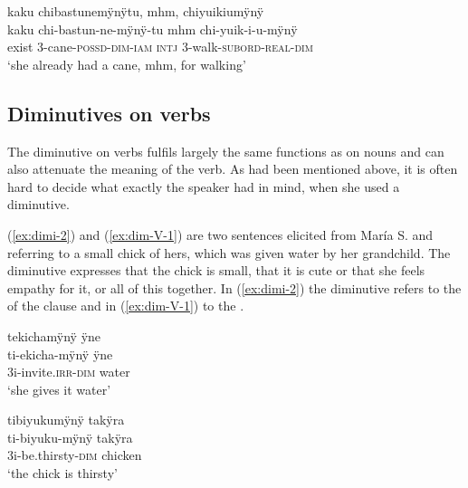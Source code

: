\ea\label{ex:dim-pity-2}
\begingl 
\glpreamble kaku chibastunemÿnÿtu, mhm, chiyuikiumÿnÿ\\
\gla kaku chi-bastun-ne-mÿnÿ-tu mhm chi-yuik-i-u-mÿnÿ\\ 
\glb exist 3-cane-\textsc{possd}-\textsc{dim}-\textsc{iam} \textsc{intj} 3-walk-\textsc{subord}-\textsc{real}-\textsc{dim}\\ 
\glft ‘she already had a cane, mhm, for walking’
\trailingcitation{[jxx-p120515l-1.220-221]}
\xe




\subsection{Diminutives on verbs}\label{sec:Diminuitves_Verbs}

The diminutive on verbs fulfils largely the same functions as on nouns and can also attenuate the meaning of the verb. As had been mentioned above, it is often hard to decide what exactly the speaker had in mind, when she used a diminutive.

(\ref{ex:dimi-2}) and (\ref{ex:dim-V-1}) are two sentences elicited from María S. and referring to a small chick of hers, which was given water by her grandchild. The diminutive expresses that the chick is small, that it is cute or that she feels empathy for it, or all of this together. In (\ref{ex:dimi-2}) the diminutive refers to the  of the clause and in (\ref{ex:dim-V-1}) to the .

\ea\label{ex:dimi-2}
\begingl
\glpreamble tekichamÿnÿ ÿne\\
\gla ti-ekicha-mÿnÿ ÿne\\
\glb 3i-invite.\textsc{irr}-\textsc{dim} water\\
\glft ‘she gives it water’
\endgl
\trailingcitation{[rmx-e150922l.051]}
\xe

\ea\label{ex:dim-V-1}
\begingl 
\glpreamble tibiyukumÿnÿ takÿra\\
\gla ti-biyuku-mÿnÿ takÿra\\ 
\glb 3i-be.thirsty-\textsc{dim} chicken\\ 
\glft ‘the chick is thirsty’
\trailingcitation{[rmx-e150922l.054]}
\xe

